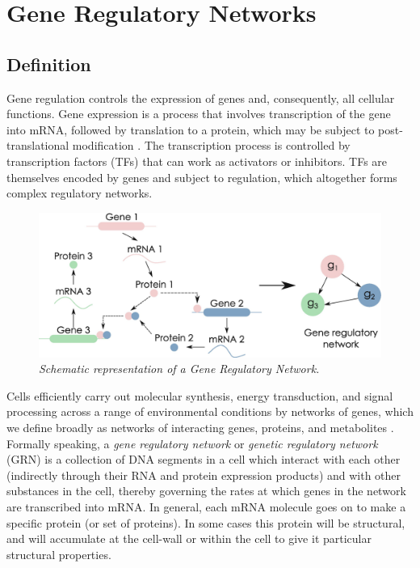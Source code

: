 \chapter{Gene Regulatory Networks}\label{grn}
\lhead[\fancyplain{}{\bfseries\thepage}]{\fancyplain{}{\bfseries\rightmark}}


\section{Definition}

Gene regulation controls the expression of genes and, consequently, all cellular functions. Gene expression is a process that involves transcription of the gene into mRNA, followed by translation to a protein, which may be subject to post-translational modification \cite{K40}. The transcription process is controlled by transcription factors (TFs) that can work as activators or inhibitors. TFs are themselves encoded by genes and subject to regulation, which altogether forms complex regulatory networks. 
\begin{figure}
\centering
\includegraphics{GRN.png}
\caption{\emph{Schematic representation of a Gene Regulatory Network.}}
\end{figure}
Cells efficiently carry out molecular synthesis, energy transduction, and signal processing across a range of environmental conditions by networks of genes, which we define broadly as networks of interacting genes, proteins, and metabolites \cite{K37}. Formally speaking, a \emph{gene regulatory network} or \emph{genetic regulatory network} (GRN) is a collection of DNA segments in a cell which interact with each other (indirectly through their RNA and protein expression products) and with other substances in the cell, thereby governing the rates at which genes in the network are transcribed into mRNA. In general, each mRNA molecule goes on to make a specific protein (or set of proteins). In some cases this protein will be structural, and will accumulate at the cell-wall or within the cell to give it particular structural properties. 

